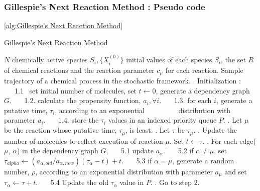 \documentclass[11pt,a4paper]{article}
\begin{document}
\subsubsection{Gillespie's Next Reaction Method : Pseudo code} \ref{alg:Gillespie's Next Reaction Method}
\begin{algorithm}[!h]                            %
\caption{Gillespie's Next Reaction Method}       %
\begin{algorithmic}                              %
\REQUIRE $N$ chemically active species $S_i, \{X_{i}^{(0)}\}$ initial values of each species $S_i$, the set $R$ of \hspace*{8mm} chemical reactions and the reaction parameter $c_{\mu}$ for each reaction.
\ENSURE Sample trajectory of a chemical process in the stochastic framework.
    . Initialization :
      \STATE \ \ \ 1.1  \ set initial number of molecules, set $t \leftarrow 0$, generate a dependency graph $G$.
      \STATE \ \ \ 1.2. calculate the propensity function, $a_{i} ,  \forall i$.
      \STATE \ \ \ 1.3. for each $i$, generate a putative time, $\tau_{i}$, according to an exponential
      \STATE \ \ \ \ \ \ \ \ \ distribution with parameter $a_{i}$.
      \STATE \ \ \ 1.4. store the $\tau_{i}$ values in an indexed priority queue $P.$
    . Let $\mu$ be the reaction whose putative time, $\tau_{\mu}$, is least.
    . Let $\tau$ be $\tau_{\mu}$.
    . Update the number of molecules to reflect execution of reaction $\mu$. Set $t \leftarrow \tau$.
    . For each edge($\mu$, $\alpha$) in the dependency graph $G$,
    \STATE \ \ \ 5.1 update $a_{\alpha}.$
    \STATE \ \ \ 5.2 if $\alpha \neq \mu$, set $\tau_{alpha} \leftarrow (a_{\alpha,old}/a_{\alpha, new})(\tau_{\alpha} - t) + t.$
    \STATE \ \ \ 5.3 if $\alpha = \mu$, generate a random number, $\rho$, according to an exponential distribution \hspace*{8mm} with parameter $a_{\mu}$ and set $\tau_{\alpha} \leftarrow \tau + t.$
    \STATE \ \ \ 5.4 Update the old $\tau_{\alpha}$ value in $P$.
    . Go to step $2$.
\ENDWHILE
\end{algorithmic}
\label{alg:Gillespie's Next Reaction Method}
\end{algorithm}
\end{document}
